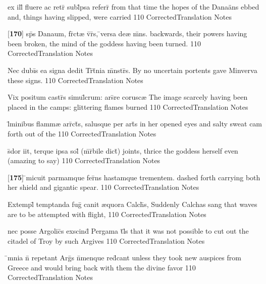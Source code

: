 \latline
  {ex ill\={} fluere ac retr\={} subl\={}psa referr\={\macron {\i}}}
  { from that time the hopes of the Dana\"ans ebbed and, things having slipped, were carried }
  {110}
  { CorrectedTranslation }
  { Notes }


\latline
  {[\textbf{170}] sp\={}s Danaum, fr\={}ct{\ae} v\={\macron {\i}}r\={}s, \={}versa de{\ae} m\={}ns.}
  { backwards, their powers having been broken, the mind of the goddess having been turned. }
  {110}
  { CorrectedTranslation }
  { Notes }


\latline
  {Nec dubi\={\macron {\i}}s ea signa dedit Tr\={\macron {\i}}t\={}nia m\={}nstr\={\macron {\i}}s.}
  { By no uncertain portents gave Minverva these signs. }
  {110}
  { CorrectedTranslation }
  { Notes }


\latline
  {Vix positum castr\={\macron {\i}}s simul\={}crum: ars\={}re corusc{\ae}}
  { The image scarcely having been placed in the camps: glittering flames burned }
  {110}
  { CorrectedTranslation }
  { Notes }


\latline
  {l\={}minibus flamm{\ae} arr\={}ct\={\macron {\i}}s, salusque per art\={}s}
  { in her opened eyes and salty sweat cam forth out of the }
  {110}
  { CorrectedTranslation }
  { Notes }


\latline
  {s\={}dor iit, terque ipsa sol\={} (m\={\macron {\i}}r\={}bile dict\={})}
  { joints, thrice the goddess herself even (amazing to say) }
  {110}
  { CorrectedTranslation }
  { Notes }


\latline
  {[\textbf{175}] \={}micuit parmamque fer\={}ns hastamque trementem.}
  { dashed forth carrying both her shield and gigantic spear. }
  {110}
  { CorrectedTranslation }
  { Notes }


\latline
  {Extempl\={} temptanda fug\={} canit {\ae}quora Calch\={}s,}
  { Suddenly Calchas sang that waves are to be attempted with flight, }
  {110}
  { CorrectedTranslation }
  { Notes }


\latline
  {nec posse Argolic\={\macron {\i}}s exscind\={\macron {\i}} Pergama t\={}l\={\macron {\i}}s}
  { that it was not possible to cut out the citadel of Troy by such Argives }
  {110}
  { CorrectedTranslation }
  { Notes }


\latline
  {\={}mnia n\={\macron {\i}} repetant Arg\={\macron {\i}}s n\={}menque red\={}cant}
  { unless they took new auspices from Greece and would bring back with them the divine favor }
  {110}
  { CorrectedTranslation }
  { Notes }


